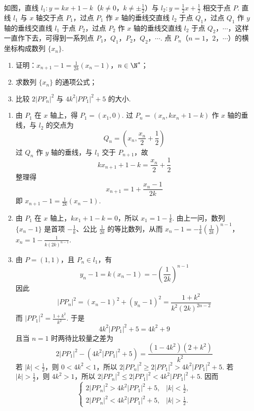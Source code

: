 \begin{problem}
如图，直线 \(l_1:y=kx+1-k\)（\(k\neq 0\)，\(k\neq\pm\frac{1}{2}\)）与 \(l_2:y=\frac{1}{2}x+\frac{1}{2}\) 相交于点 \(P\). 直线 \(l_1\) 与 \(x\) 轴交于点 \(P_1\)，过点 \(P_1\) 作 \(x\) 轴的垂线交直线 \(l_2\) 于点 \(Q_1\)，过点 \(Q_1\) 作 \(y\) 轴的垂线交直线 \(l_1\) 于点 \(P_2\)，过点 \(P_2\) 作 \(x\) 轴的垂线交直线 \(l_2\) 于点 \(Q_2\)，\(\cdots\)，这样一直作下去，可得到一系列点 \(P_1\)，\(Q_1\)，\(P_2\)，\(Q_2\)，\(\cdots\). 点 \(P_n\)（\(n=1\)，\(2\)，\(\cdots\)）的横坐标构成数列 \(\{x_n\}\).

\begin{enumerate}
\item 证明：\(x_{n+1}-1=\frac{1}{2k}(x_n-1)\)，\(n\in\N^{*}\)；
\item 求数列 \(\{x_n\}\) 的通项公式；
\item 比较 \(2\left|PP_n\right|^{2}\) 与 \(4k^{2}\left|PP_1\right|^{2}+5\) 的大小.
\end{enumerate}

\end{problem}

\begin{solution}
\begin{enumerate}
\item 由 \(P_1\) 在 \(x\) 轴上，得 \(P_1=(x_1,0)\). 过 \(P_n=(x_n,kx_n+1-k)\) 作 \(x\) 轴的垂线，与 \(l_2\) 的交点为
\[
Q_n=\left(x_n,\frac{x_n}{2}+\frac{1}{2}\right)
\]
过 \(Q_n\) 作 \(y\) 轴的垂线，与 \(l_1\) 交于 \(P_{n+1}\)，故
\[
kx_{n+1}+1-k=\frac{x_n}{2}+\frac{1}{2}
\]
整理得
\[
x_{n+1}=1+\frac{x_n-1}{2k}
\]
即 \(x_{n+1}-1=\frac{1}{2k}(x_n-1)\).
\item 由 \(P_1\) 在 \(x\) 轴上，\(kx_1+1-k=0\)，所以 \(x_1=1-\frac{1}{k}\). 由上一问，数列 \(\{x_n-1\}\) 是首项 \(-\frac{1}{k}\)、公比 \(\frac{1}{2k}\) 的等比数列，从而
\(x_n-1=-\frac{1}{k}\left(\frac{1}{2k}\right)^{n-1}\)，\(x_n=1-\frac{1}{k(2k)^{n-1}}\).
\item 由 \(P=(1,1)\)，且 \(P_n\in l_1\)，有
\[
y_n-1=k(x_n-1)=-\left(\frac{1}{2k}\right)^{n-1}
\]
因此
\[
\left|PP_n\right|^2=(x_n-1)^2+(y_n-1)^2=\frac{1+k^2}{k^2(2k)^{2n-2}}
\]
而 \(\left|PP_1\right|^2=\frac{1+k^2}{k^2}\). 于是
\[
4k^2\left|PP_1\right|^2+5=4k^2+9
\]
且当 \(n=1\) 时两待比较量之差为
\[
2\left|PP_1\right|^2-\left(4k^2\left|PP_1\right|^2+5\right)=\frac{(1-4k^2)(2+k^2)}{k^2}
\]
若 \(\left|k\right|<\frac{1}{2}\)，则 \(0<4k^2<1\)，所以 \(2\left|PP_n\right|^2\geq 2\left|PP_1\right|^2>4k^2\left|PP_1\right|^2+5\). 若 \(\left|k\right|>\frac{1}{2}\)，则 \(4k^2>1\)，所以 \(2\left|PP_n\right|^2\leq 2\left|PP_1\right|^2<4k^2\left|PP_1\right|^2+5\). 因而
\[
\begin{cases}
2\left|PP_n\right|^2>4k^2\left|PP_1\right|^2+5,&\left|k\right|<\frac{1}{2},\\
2\left|PP_n\right|^2<4k^2\left|PP_1\right|^2+5,&\left|k\right|>\frac{1}{2}.
\end{cases}
\]
\end{enumerate}
\end{solution}
